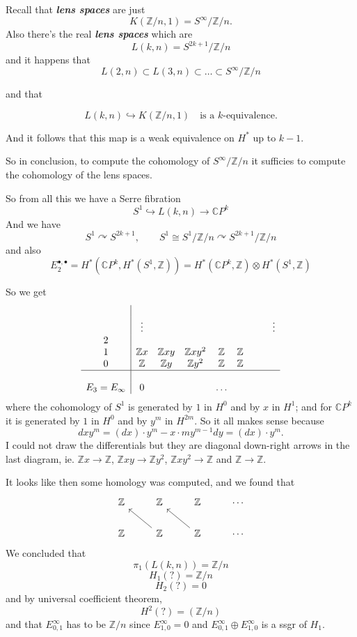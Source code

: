 \documentclass{article}
\newcommand{\C}{\mathbb{C}}
\newcommand{\Z}{\mathbb{Z}}
\begin{document}
\begin{example}
	Recall that \textit{\textbf{lens spaces}} are just
	\[K(\Z/n,1)=S^\infty/\Z/n.\]
Also there's the real \textit{\textbf{lens spaces}} which are
\[L(k,n)=S^{2k+1}/\Z/n\]
and it happens that
\[L(2,n)\subset L(3,n)\subset \ldots\subset S^\infty/\Z/n\]

and that

\[L(k,n)\hookrightarrow K(\Z/n,1)\quad \text{is a }k\text{-equivalence.}\]

And it follows that this map is a {\color{magenta}weak equivalence} on $H^{*}$ up to $k-1$.

So in conclusion, to compute the cohomology of $S^\infty/\Z/n$ it sufficies to compute the cohomology of the lens spaces.

So from all this we have a Serre fibration
\[S^1\hookrightarrow L(k,n)\to \C P^k\]
And we have
\[S^1\curvearrowright S^{2k+1},\qquad S^1\cong S^1/\Z/n\curvearrowright S^{2k+1}/\Z/n\]
and also
\[E^{\bullet,\bullet}_2=H^{*}(\C P^k,H^{*}(S^1,\Z))=H^{*}(\C P^k,\Z)\otimes H^{*}(S^1,\Z)\]

So we get
\begin{align*}
\begin{array}{c|cccccccc}
	&&&&&&&&\\
	 &\vdots&&&&&&&\vdots\\
	2&&&&&&&&\\
	1&\Z x&\Z xy&\Z xy^2&\Z&\Z&&&\\
	0&\Z&\Z y&\Z y^2&\Z&\Z&&&\\
	\hline\\
	E_3=E_\infty&0&&&\ldots&&&&
\end{array}
\end{align*}
where the cohomology of $S^1$ is generated by $1$ in $H^{0}$ and by $x$ in $H^1$; and for $\C P^k$ it is generated by $1$ in $H^0$ and by $y^m$ in $H^{2m}$. So it all makes sense because
\[dxy^m=(dx)\cdot y^m-x\cdot my^{m-1}dy=(dx)\cdot y^m.\]
{\color{blue}I could not draw the differentials but they are diagonal down-right arrows in the last diagram, ie. $\Z x\to \Z$, $\Z xy\to \Z y^2$, $\Z xy^2\to \Z$ and $\Z\to \Z$.}

It looks like then some homology was computed, and we found that
\[\begin{tikzcd}
	\Z&\Z&\Z&\cdots\\
	\Z&\Z\arrow[ul]&\Z\arrow[ul]&\cdots
\end{tikzcd}\]
We concluded that
\[\pi_{1}(L(k,n))=\Z/n\]
\[H_{1}(?)=\Z/n\]
\[H_{2}(?)=0\]
and by universal coefficient theorem,
\[H^2(?)=(\Z/n)\]
and that $E^\infty_{0,1}$ has to be $\Z/n$ since $E^\infty_{1,0}=0$ and $E^\infty_{0,1}\oplus E^\infty_{1,0}$ is a ssgr of $H_1$.


\end{example}
\end{document}
